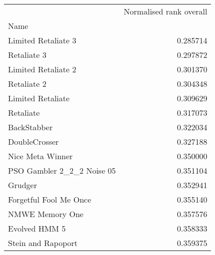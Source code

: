 \begin{tabular}{lr}
\toprule
{} &  Normalised rank overall \\
Name                       &                          \\
\midrule
Limited Retaliate 3        &                 0.285714 \\
Retaliate 3                &                 0.297872 \\
Limited Retaliate 2        &                 0.301370 \\
Retaliate 2                &                 0.304348 \\
Limited Retaliate          &                 0.309629 \\
Retaliate                  &                 0.317073 \\
BackStabber                &                 0.322034 \\
DoubleCrosser              &                 0.327188 \\
Nice Meta Winner           &                 0.350000 \\
PSO Gambler 2\_2\_2 Noise 05 &                 0.351104 \\
Grudger                    &                 0.352941 \\
Forgetful Fool Me Once     &                 0.355140 \\
NMWE Memory One            &                 0.357576 \\
Evolved HMM 5              &                 0.358333 \\
Stein and Rapoport         &                 0.359375 \\
\bottomrule
\end{tabular}
